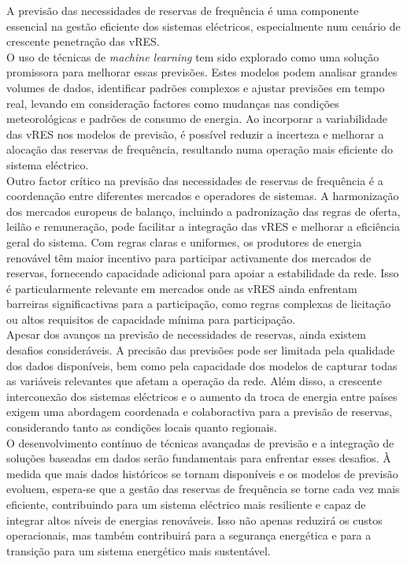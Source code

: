 A previsão das necessidades de reservas de frequência é uma componente essencial na gestão eficiente dos sistemas eléctricos, especialmente num cenário de crescente penetração das \gls{vRES}.\\
O uso de técnicas de \textit{machine learning} tem sido explorado como uma solução promissora para melhorar essas previsões. Estes modelos podem analisar grandes volumes de dados, identificar padrões complexos e ajustar previsões em tempo real, levando em consideração factores como mudanças nas condições meteorológicas e padrões de consumo de energia. Ao incorporar a variabilidade das \gls{vRES} nos modelos de previsão, é possível reduzir a incerteza e melhorar a alocação das reservas de frequência, resultando numa operação mais eficiente do sistema eléctrico.\\
Outro factor crítico na previsão das necessidades de reservas de frequência é a coordenação entre diferentes mercados e operadores de sistemas. A harmonização dos mercados europeus de balanço, incluindo a padronização das regras de oferta, leilão e remuneração, pode facilitar a integração das \gls{vRES} e melhorar a eficiência geral do sistema. Com regras claras e uniformes, os produtores de energia renovável têm maior incentivo para participar activamente dos mercados de reservas, fornecendo capacidade adicional para apoiar a estabilidade da rede. Isso é particularmente relevante em mercados onde as \gls{vRES} ainda enfrentam barreiras significactivas para a participação, como regras complexas de licitação ou altos requisitos de capacidade mínima para participação.\\
Apesar dos avanços na previsão de necessidades de reservas, ainda existem desafios consideráveis. A precisão das previsões pode ser limitada pela qualidade dos dados disponíveis, bem como pela capacidade dos modelos de capturar todas as variáveis relevantes que afetam a operação da rede. Além disso, a crescente interconexão dos sistemas eléctricos e o aumento da troca de energia entre países exigem uma abordagem coordenada e colaboractiva para a previsão de reservas, considerando tanto as condições locais quanto regionais.\\
O desenvolvimento contínuo de técnicas avançadas de previsão e a integração de soluções baseadas em dados serão fundamentais para enfrentar esses desafios. À medida que mais dados históricos se tornam disponíveis e os modelos de previsão evoluem, espera-se que a gestão das reservas de frequência se torne cada vez mais eficiente, contribuindo para um sistema eléctrico mais resiliente e capaz de integrar altos níveis de energias renováveis. Isso não apenas reduzirá os custos operacionais, mas também contribuirá para a segurança energética e para a transição para um sistema energético mais sustentável.\\




\thispagestyle{plain}
